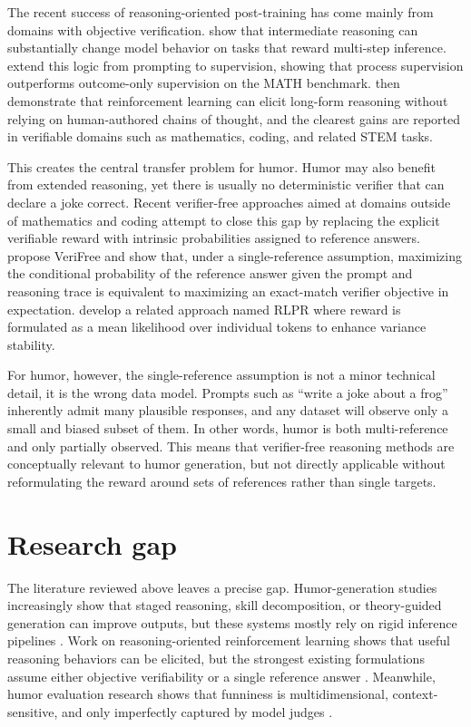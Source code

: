The recent success of reasoning-oriented post-training has come mainly from domains with objective verification. \citet{Wei2022} show that intermediate reasoning can substantially change model behavior on tasks that reward multi-step inference. \citet{Lightman2023} extend this logic from prompting to supervision, showing that process supervision outperforms outcome-only supervision on the MATH benchmark. \citet{DeepSeek2025} then demonstrate that reinforcement learning can elicit long-form reasoning without relying on human-authored chains of thought, and the clearest gains are reported in verifiable domains such as mathematics, coding, and related STEM tasks.

This creates the central transfer problem for humor. Humor may also benefit from extended reasoning, yet there is usually no deterministic verifier that can declare a joke correct. Recent verifier-free approaches aimed at domains outside of mathematics and coding attempt to close this gap by replacing the explicit verifiable reward with intrinsic probabilities assigned to reference answers. \citet{Zhou2025} propose VeriFree and show that, under a single-reference assumption, maximizing the conditional probability of the reference answer given the prompt and reasoning trace is equivalent to maximizing an exact-match verifier objective in expectation. \citet{Yu2025} develop a related approach named RLPR where reward is formulated as a mean likelihood over individual tokens to enhance variance stability.

For humor, however, the single-reference assumption is not a minor technical detail, it is the wrong data model. Prompts such as ``write a joke about a frog'' inherently admit many plausible responses, and any dataset will observe only a small and biased subset of them. In other words, humor is both multi-reference and only partially observed. This means that verifier-free reasoning methods are conceptually relevant to humor generation, but not directly applicable without reformulating the reward around sets of references rather than single targets.

\section{Research gap}

The literature reviewed above leaves a precise gap. Humor-generation studies increasingly show that staged reasoning, skill decomposition, or theory-guided generation can improve outputs, but these systems mostly rely on rigid inference pipelines \citep{chen2023prompt,zhong2024let,Tikhonov2024,Kim2025,ZhangJ2025}. Work on reasoning-oriented reinforcement learning shows that useful reasoning behaviors can be elicited, but the strongest existing formulations assume either objective verifiability or a single reference answer \citep{Lightman2023,DeepSeek2025,Zhou2025,Yu2025}. Meanwhile, humor evaluation research shows that funniness is multidimensional, context-sensitive, and only imperfectly captured by model judges \citep{Zhang2024HumorAI,Sakabe2025,winters2025evaluating,Hashemi2024}.

